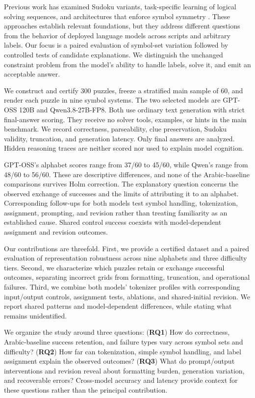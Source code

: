 \documentclass[11pt]{article}
\begin{document}
Previous work has examined Sudoku variants, task-specific learning of logical solving sequences, and architectures that enforce symbol symmetry \citep{seely2025sudokubench,shah2024causal,freinschlag2026equivariant}. These approaches establish relevant foundations, but they address different questions from the behavior of deployed language models across scripts and arbitrary labels. Our focus is a paired evaluation of symbol-set variation followed by controlled tests of candidate explanations. We distinguish the unchanged constraint problem from the model's ability to handle labels, solve it, and emit an acceptable answer.

We construct and certify 300 puzzles, freeze a stratified main sample of 60, and render each puzzle in nine symbol systems. The two selected models are GPT-OSS 120B and Qwen3.8-27B-FP8. Both use ordinary text generation with strict final-answer scoring. They receive no solver tools, examples, or hints in the main benchmark. We record correctness, parseability, clue preservation, Sudoku validity, truncation, and generation latency. Only final answers are analyzed. Hidden reasoning traces are neither scored nor used to explain model cognition.

GPT-OSS's alphabet scores range from 37/60 to 45/60, while Qwen's range from 48/60 to 56/60. These are descriptive differences, and none of the Arabic-baseline comparisons survives Holm correction. The explanatory question concerns the observed exchange of successes and the limits of attributing it to an alphabet. Corresponding follow-ups for both models test symbol handling, tokenization, assignment, prompting, and revision rather than treating familiarity as an established cause. Shared control success coexists with model-dependent assignment and revision outcomes.

Our contributions are threefold. First, we provide a certified dataset and a paired evaluation of representation robustness across nine alphabets and three difficulty tiers. Second, we characterize which puzzles retain or exchange successful outcomes, separating incorrect grids from formatting, truncation, and operational failures. Third, we combine both models' tokenizer profiles with corresponding input/output controls, assignment tests, ablations, and shared-initial revision. We report shared patterns and model-dependent differences, while stating what remains unidentified.

We organize the study around three questions: (\textbf{RQ1}) How do correctness, Arabic-baseline success retention, and failure types vary across symbol sets and difficulty? (\textbf{RQ2}) How far can tokenization, simple symbol handling, and label assignment explain the observed outcomes? (\textbf{RQ3}) What do prompt/output interventions and revision reveal about formatting burden, generation variation, and recoverable errors? Cross-model accuracy and latency provide context for these questions rather than the principal contribution.
\end{document}
